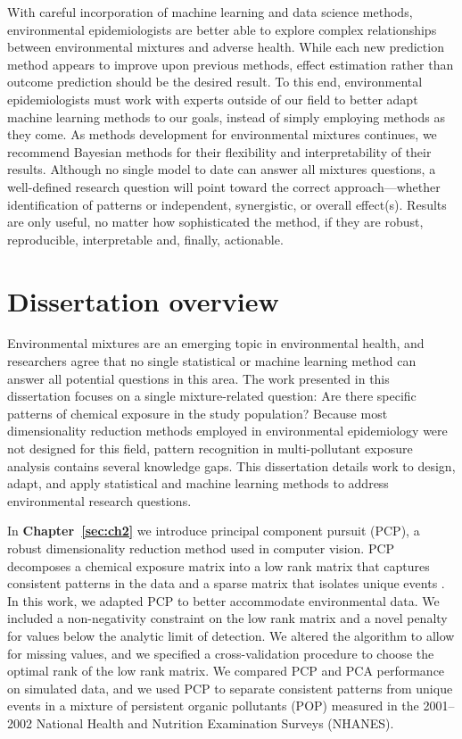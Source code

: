 With careful incorporation of machine learning and data science methods, environmental epidemiologists are better able to explore complex relationships between environmental mixtures and adverse health. While each new prediction method appears to improve upon previous methods, effect estimation rather than outcome prediction should be the desired result. To this end, environmental epidemiologists must work with experts outside of our field to better adapt machine learning methods to our goals, instead of simply employing methods as they come. As methods development for environmental mixtures continues, we recommend Bayesian methods for their flexibility and interpretability of their results. Although no single model to date can answer all mixtures questions, a well-defined research question will point toward the correct approach---whether identification of patterns or independent, synergistic, or overall effect(s). Results are only useful, no matter how sophisticated the method, if they are robust, reproducible, interpretable and, finally, actionable.\footnotemark


\section{Dissertation overview}\label{sec:diss_over}

Environmental mixtures are an emerging topic in environmental health, and researchers agree that no single statistical or machine learning method can answer all potential questions in this area. The work presented in this dissertation focuses on a single mixture-related question: Are there specific patterns of chemical exposure in the study population? Because most dimensionality reduction methods employed in environmental epidemiology were not designed for this field, pattern recognition in  multi-pollutant exposure analysis contains several knowledge gaps. This dissertation details work to design, adapt, and apply statistical and machine learning methods to address environmental research questions.

In \textbf{Chapter~\ref{sec:ch2}} we introduce principal component pursuit (PCP), a robust dimensionality reduction method used in computer vision. PCP decomposes a chemical exposure matrix into a low rank matrix that captures consistent patterns in the data and a sparse matrix that isolates unique events \citep{pcp}. In this work, we adapted PCP to better accommodate environmental data. We included a non-negativity constraint on the low rank matrix and a novel penalty for values below the analytic limit of detection. We altered the algorithm to allow for missing values, and we specified a cross-validation procedure to choose the optimal rank of the low rank matrix. We compared PCP and PCA performance on simulated data, and we used PCP to separate consistent patterns from unique events in a mixture of persistent organic pollutants (POP) measured in the 2001--2002 National Health and Nutrition Examination Surveys (NHANES).

